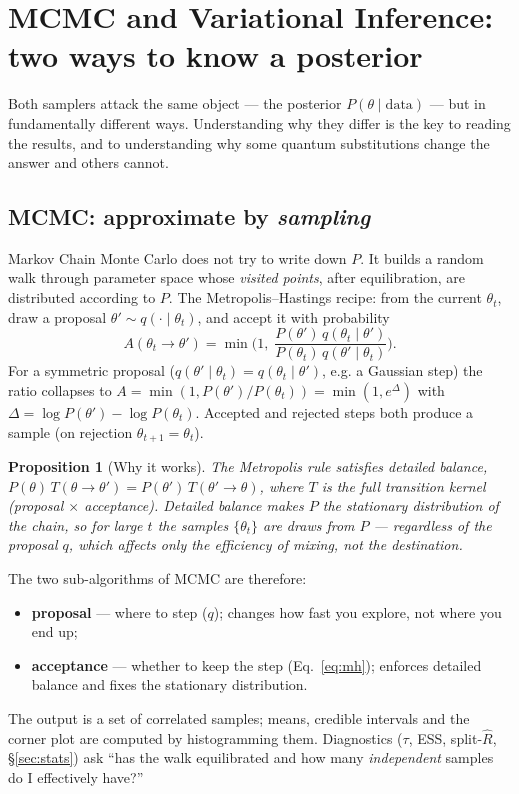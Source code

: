 \documentclass[11pt]{article}
\newtheorem{proposition}{Proposition}[section]
\newcommand{\Rhat}{\hat{R}}
\begin{document}
\section{MCMC and Variational Inference: two ways to know a posterior}
\label{sec:mcmc_vi}

Both samplers attack the same object --- the posterior $P(\theta\mid
\mathrm{data})$ --- but in fundamentally different ways. Understanding why they
differ is the key to reading the results, and to understanding why some quantum
substitutions change the answer and others cannot.

\subsection{MCMC: approximate by \emph{sampling}}

Markov Chain Monte Carlo does not try to write down $P$. It builds a random
walk through parameter space whose \emph{visited points}, after equilibration,
are distributed according to $P$. The Metropolis--Hastings recipe: from the
current $\theta_t$, draw a proposal $\theta'\sim q(\cdot\mid\theta_t)$, and
accept it with probability
\begin{equation}
A(\theta_t\!\to\!\theta') = \min\!\Big(1,\;
\frac{P(\theta')\,q(\theta_t\mid\theta')}{P(\theta_t)\,q(\theta'\mid\theta_t)}\Big).
\label{eq:mh}
\end{equation}
For a symmetric proposal ($q(\theta'\mid\theta_t)=q(\theta_t\mid\theta')$, e.g.
a Gaussian step) the ratio collapses to $A=\min(1,P(\theta')/P(\theta_t))=
\min(1,e^{\Delta})$ with $\Delta=\log P(\theta')-\log P(\theta_t)$. Accepted
and rejected steps both produce a sample (on rejection $\theta_{t+1}=\theta_t$).

\begin{proposition}[Why it works]
The Metropolis rule satisfies \emph{detailed balance},
$P(\theta)\,T(\theta\!\to\!\theta')=P(\theta')\,T(\theta'\!\to\!\theta)$, where
$T$ is the full transition kernel (proposal $\times$ acceptance). Detailed
balance makes $P$ the stationary distribution of the chain, so for large $t$
the samples $\{\theta_t\}$ are draws from $P$ --- regardless of the proposal
$q$, which affects only the \emph{efficiency} of mixing, not the
\emph{destination}.
\end{proposition}

The two sub-algorithms of MCMC are therefore:
\begin{itemize}[nosep]
\item \textbf{proposal} --- where to step ($q$); changes how fast you explore,
not where you end up;
\item \textbf{acceptance} --- whether to keep the step (Eq.~\ref{eq:mh});
enforces detailed balance and fixes the stationary distribution.
\end{itemize}
The output is a set of correlated samples; means, credible intervals and the
corner plot are computed by histogramming them. Diagnostics ($\tau$, ESS,
split-$\Rhat$, \S\ref{sec:stats}) ask ``has the walk equilibrated and how many
\emph{independent} samples do I effectively have?''
\end{document}
